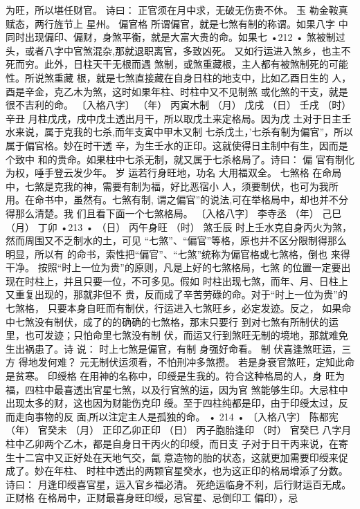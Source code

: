 为旺，所以堪任财官。
诗曰：
正官须在月中求，无破无伤贵不休。
玉 勒金鞍真赋态，两行旌节上 星州。
偏官格 所谓偏官，就是七煞有制的称谓。如果八字
中同时出现偏印、偏财，身煞平衡，就是大富大贵的命。如果七
•212 •
煞被制过头，或者八字中官煞混杂,那就退职离官，多致凶死。
又如行运进入煞乡，也主不死而穷。此外，日柱天干无根而遇
煞制，或煞重藏根，主人都有被煞制死的可能性。所说煞重藏
根，就是七煞直接藏在自身日柱的地支中，比如乙酉日生的
人，酉是辛金，克乙木为煞，这时如果年柱、时柱中又不见制煞
或化煞的干支，就是很不吉利的命。
〔入格八字〕
（年） 丙寅木制
（月） 戊戌
（日） 壬戌
（时） 辛丑
月柱戊戌，戌中戊土透出月干，所以取戊土来定格局。因为戊
土对于日主壬水来说，属于克我的七杀,而年支寅中甲木又制
七杀戊土，'七杀有制为偏官”，所以属于偏官格。妙在时干透
辛，为生壬水的正印。这就使得日主制中有生，因而是个致中
和的贵命。如果柱中七杀无制，就又属于七杀格局了。诗曰：
偏 官有制化为权，唾手登云发少年。
岁 运若行身旺地，功名 大用福双全。
七煞格
在命局中，七煞是克我的神，需要有制为福，好比恶宿小
人，须要制伏，也可为我所用。在命书中，虽然有。七煞有制,
谓之偏官”的说法,可在举格局中，却也并不分得那么清楚。我
们且看下面一个七煞格局。
〔入格八字〕 李寺丞
（年） 己巳
（月） 丁卯
•213 •
（日） 丙午身旺
（时） 煞壬辰
时上壬水克自身丙火为煞，然而周围又不乏制水的土，可见
“七煞”、“偏官”等格，原也并不区分限制得那么明显，所以有
的命书，索性把“偏官”、“七煞”统称为偏官格或七煞格，倒也
来得干净。
按照“时上一位为贵”的原则，凡是上好的七煞格局，七煞
的位置一定要出现在时柱上，并且只要一位，不可多见。假如
时柱出现七煞，而年、月、日柱上又重复出现的，那就非但不
贵，反而成了辛苦劳碌的命。对于“时上一位为贵”的七煞格，
只要本身自旺而有制伏，行运进入七煞旺乡，必定发迹。反之，
如果命中七煞没有制伏，成了的的确确的七煞格，那末只要行
到对七煞有所制伏的运里，也可发迹；只怕命里七煞没有制
伏，而运又行到煞旺无制的境地，那就难免生出祸患了。诗
说：
时上七煞是偏官，有制 身强好命看。
制 伏喜逢煞旺运，三方 得地发何难？
元无制伏运须看，不怕刑冲多煞攒。
若是身衰官煞旺，定知此命是贫寒。
印绶格
在用神的名称中，印绶是生我的。符合这种格局的人，身
旺为福，四柱中最喜透出官星七煞，以及行官煞的运，因为官
煞能够生印。大忌柱中出现太多的财，这也因为财能伤克印
绶。至于四柱纯都是印，由于印绶太过，反而走向事物的反
面,所以注定主人是孤独的命。
• 214 •
〔入格八字〕 陈都宪
（年） 官癸未
（月） 正印乙卯正印
（日） 丙子胞胎逢印
（时） 官癸巳
八字月柱中乙卯两个乙木，都是自身日干丙火的印绶，而日支
子对于日干丙来说，在寄生十二宫中又正好处在天地气交，氤
意造物的胎的状态，这就更加需要印绶来促成了。妙在年柱、
时柱中透出的两颗官星癸水，也为这正印的格局增添了分数。
诗曰：
月逢印绶喜官星，运入官乡福必清。
死绝运临身不利，后行财运百无成。
正财格
在格局中，正财最喜身旺印绶，忌官星、忌倒印工 偏印），忌

